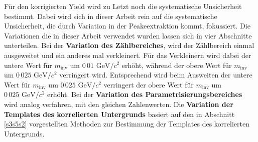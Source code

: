 Für den korrigierten Yield wird zu Letzt noch die systematische Unsicherheit bestimmt.
Dabei wird sich in dieser Arbeit rein auf die systematische Unsicherheit, die durch Variation in der Peakeextraktion kommt, fokussiert.
Die Variationen die in dieser Arbeit verwendet wurden lassen sich in vier Abschnitte unterteilen.
\newline
Bei der \textbf{Variation des Zählbereiches}, wird der Zählbereich einmal ausgeweitet und ein anderes mal verkleinert.
Für das Verkleinern wird dabei der untere Wert für $m_\text{inv}$ um $0\,01 \text{ GeV}/c^{2}$ erhöht, während der obere Wert für $m_\text{inv}$ um $0\,025 \text{ GeV}/c^{2}$ verringert wird.
Entsprechend wird beim Ausweiten der untere Wert für $m_\text{inv}$ um $0\,025 \text{ GeV}/c^{2}$ verringert der obere Wert für $m_\text{inv}$ um $0\,025 \text{ GeV}/c^{2}$ erhöht.
Bei der \textbf{Variation des Parametrisierungsbereiches} wird analog verfahren, mit den gleichen Zahlenwerten.
\newline
Die \textbf{Variation der Templates des korrelierten Untergrunds} basiert auf den in Abschnitt \ref{s3s5s2} vorgestellten Methoden zur Bestimmung der Templates des korrelierten Untergrunds.
